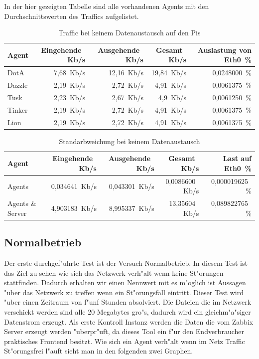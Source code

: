 In der hier gezeigten Tabelle sind alle vorhandenen Agents mit den Durchschnittswerten des Traffics aufgelistet. 
\begin{table}
\centering
\begin{tabular}{l%
 r<{\,Kb/s}%
 r<{\,Kb/s}%
 r<{\,Kb/s}%
 r<{\,\%}%
}
Agent  	& Eingehende		& Ausgehende		& Gesamt		& Auslastung von Eth0	\\
\hline
DotA	& 7,68			& 12,16			& 19,84			& 0,0248000 		\\
Dazzle 	& 2,19	 		& 2,72			& 4,91			& 0,0061375 		\\
Tusk 	& 2,23			& 2,67			& 4,9			& 0,0061250 		\\
Tinker	& 2,19	 		& 2,72	 		& 4,91	 		& 0,0061375		\\
Lion	& 2,19	 		& 2,72	 		& 4,91  		& 0,0061375		\\
\end{tabular}
\caption{Traffic bei keinem Datenaustausch auf den Pis}
\label{tab:standardTraffic}
\end{table}

\begin{table}
\centering
\begin{tabular}{l%
 r<{\,Kb/s}%
 r<{\,Kb/s}%
 r<{\,Kb/s}%
 r<{\,\%}%
}
Agent		& Eingehende            & Ausgehende            & Gesamt                & Last auf Eth0 \\
\hline
Agents		& 0,034641              & 0,043301              & 0,0086600             & 0,000019625  \\
Agents \& Server& 4,903183 		& 8,995337        	& 13,35604            	& 0,089822765        \\
\end{tabular}
\caption{Standarbweichung bei keinem Datenaustausch}
\label{tab:standardTrafficAbweichung}
\end{table}


\subsection{Normalbetrieb}
\label{subsec:normalbetrieb}
Der erste durchgef"uhrte Test ist der Versuch Normalbetrieb. In diesem Test ist das Ziel zu sehen wie %
sich das Netzwerk verh"alt wenn keine St"orungen stattfinden. Dadurch erhalten wir einen Nennwert mit es m"oglich ist %
Aussagen "uber das Netzwerk zu treffen wenn ein St"orungsfall eintritt. Dieser Test wird "uber einen Zeitraum von f"unf %
Stunden absolviert. Die Dateien die im Netzwerk verschickt werden sind alle 20 Megabytes gro"s, dadurch wird ein %
gleichm"a"siger Datenstrom erzeugt. Als erste Kontroll Instanz werden die Daten die vom Zabbix Server erzeugt werden %
"uberpr"uft, da dieses Tool ein f"ur den Endverbraucher praktisches Frontend besitzt. Wie sich ein Agent verh"alt %
wenn im Netz Traffic St"orungsfrei l"auft sieht man in den folgenden zwei Graphen.

